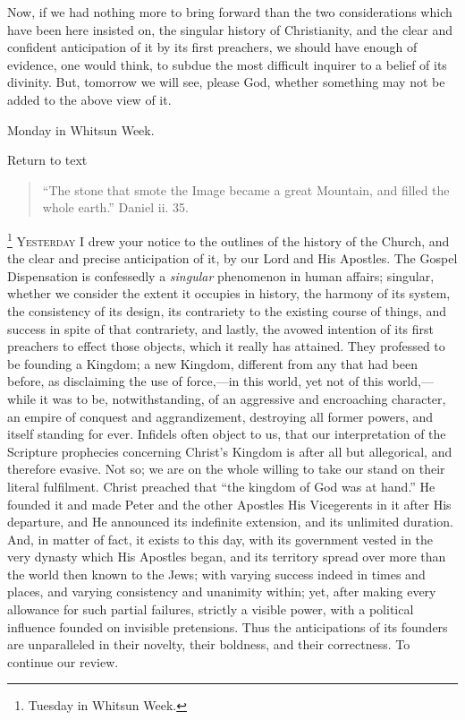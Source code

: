 Now, if we had nothing more to bring forward than the two
considerations which have been here insisted on, the singular history of
Christianity, and the clear and confident anticipation of it by its
first preachers, we should have enough of evidence, one would think, to
subdue the most difficult inquirer to a belief of its divinity. But,
tomorrow we will see, please God, whether something may not be added to
the above view of it.


Monday in Whitsun Week.

Return to text


\begin{quote}

``The stone that smote the Image became a great Mountain, and
filled the whole earth.'' Daniel ii. 35.

\end{quote}

\footnote{Tuesday in Whitsun Week.} Y\textsc{esterday} I drew your
notice to the outlines of the history of the Church, and the clear and
precise anticipation of it, by our Lord and His Apostles. The Gospel
Dispensation is confessedly a \emph{singular} phenomenon in human
affairs; singular, whether we consider the extent it occupies in
history, the harmony of its system, the consistency of its design, its
contrariety to the existing course of things, and success in spite of
that contrariety, and lastly, the avowed intention of its first
preachers to effect those objects, which it really has attained. They
professed to be founding a Kingdom; a new Kingdom, different from any
that had been before, as disclaiming the use of force,—in this world,
yet not of this world,—while it was to be, notwithstanding, of an
aggressive and encroaching character, an empire of conquest and aggrandizement, destroying all former powers, and itself standing for
ever. Infidels often object to us, that our interpretation of the
Scripture prophecies concerning Christ's Kingdom is after all but
allegorical, and therefore evasive. Not so; we are on the whole willing
to take our stand on their literal fulfilment. Christ preached that
``the kingdom of God was at hand.'' He founded it and made Peter
and the other Apostles His Vicegerents in it after His departure, and He
announced its indefinite extension, and its unlimited duration. And, in
matter of fact, it exists to this day, with its government vested in the
very dynasty which His Apostles began, and its territory spread over
more than the world then known to the Jews; with varying success indeed
in times and places, and varying consistency and unanimity within; yet,
after making every allowance for such partial failures, strictly a
visible power, with a political influence founded on invisible
pretensions. Thus the anticipations of its founders are unparalleled in
their novelty, their boldness, and their correctness. To continue our
review.

